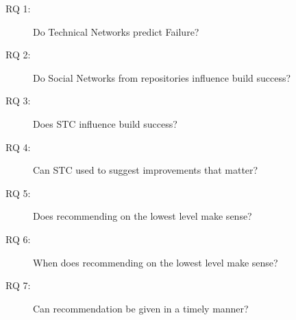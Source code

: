 

\begin{description}
% 
\item[RQ 1:] Do Technical Networks predict Failure?
\item[RQ 2:] Do Social Networks from repositories influence build success?
\item[RQ 3:] Does STC influence build success?
%
\item[RQ 4:] Can STC used to suggest improvements that matter?
\item[RQ 5:] Does recommending on the lowest level make sense?
%
\item[RQ 6:] When does recommending on the lowest level make sense?
\item[RQ 7:] Can recommendation be given in a timely manner? 
\end{description}